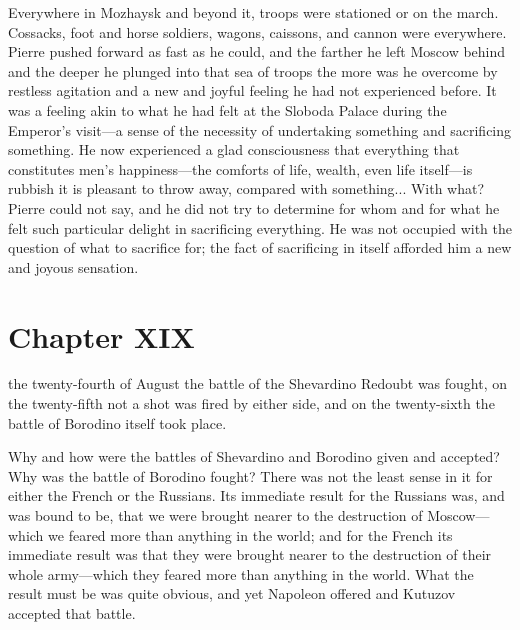 Everywhere in Mozhaysk and beyond it, troops were stationed or on
the march. Cossacks, foot and horse soldiers, wagons, caissons,
and cannon were everywhere. Pierre pushed forward as fast as he
could, and the farther he left Moscow behind and the deeper he
plunged into that sea of troops the more was he overcome by
restless agitation and a new and joyful feeling he had not
experienced before. It was a feeling akin to what he had felt at
the Sloboda Palace during the Emperor's visit---a sense of the
necessity of undertaking something and sacrificing something. He
now experienced a glad consciousness that everything that
constitutes men's happiness---the comforts of life, wealth, even
life itself---is rubbish it is pleasant to throw away, compared
with something... With what? Pierre could not say, and he did not
try to determine for whom and for what he felt such particular
delight in sacrificing everything. He was not occupied with the
question of what to sacrifice for; the fact of sacrificing in
itself afforded him a new and joyous sensation.


\chapter*{Chapter XIX} \ifaudio {}
\fi

 the twenty-fourth of August the battle of the Shevardino
Redoubt was fought, on the twenty-fifth not a shot was fired by
either side, and on the twenty-sixth the battle of Borodino
itself took place.

Why and how were the battles of Shevardino and Borodino given and
accepted? Why was the battle of Borodino fought? There was not
the least sense in it for either the French or the Russians. Its
immediate result for the Russians was, and was bound to be, that
we were brought nearer to the destruction of Moscow---which we
feared more than anything in the world; and for the French its
immediate result was that they were brought nearer to the
destruction of their whole army---which they feared more than
anything in the world. What the result must be was quite obvious,
and yet Napoleon offered and Kutuzov accepted that battle.

